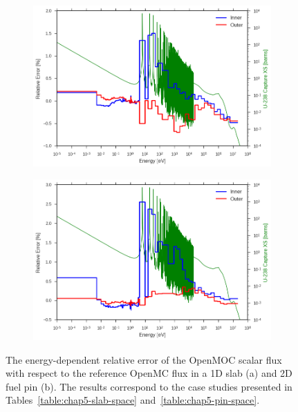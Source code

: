 \begin{figure}[h!]
\begin{subfigure}{.9\textwidth}
  \centering
  \includegraphics[width=\linewidth]{figures/biases/slab/rel-err-inner-outer}
  \caption{}
\end{subfigure}
\begin{subfigure}{.9\textwidth}
  \centering
  \includegraphics[width=\linewidth]{figures/biases/pin-cell/rel-err-inner-outer}
  \caption{}
\end{subfigure}
\caption[Flux relative error by energy group]{The energy-dependent relative error of the OpenMOC scalar flux with respect to the reference OpenMC flux in a 1D slab (a) and 2D fuel pin (b). The results correspond to the case studies presented in Tables~\ref{table:chap5-slab-space} and~\ref{table:chap5-pin-space}.}
\label{fig:chap5-rel-err-energy}
\end{figure}

